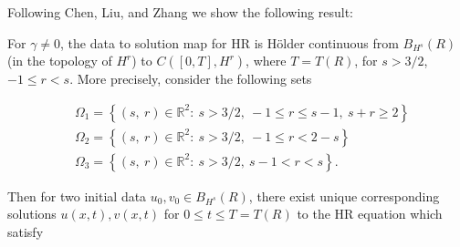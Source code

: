 \documentclass[handout]{beamer}
\numberwithin{equation}{section}
\newcommand{\rr}{\mathbb{R}}
\begin{document}
\begin{frame}
Following Chen, Liu, and Zhang \cite{Chen:2011fk} we show the
following result:


\begin{theorem}

\label{thm:main-thm}
For $\gamma \neq 0$, the
data to solution map for HR is H\"older continuous from $B_{H^{s}}(R)$ (in
the topology of $H^{r}$) to $C([0, T], H^{r})$, where $T = T(R)$, for $s >
3/2$, $-1 \le r < s$. More
precisely, consider the following sets 

  
  \begin{equation*}
  \begin{split}
      & \Omega_{1} = \left\{ (s, \ r) \in \rr^{2}:
     \ s>3/2, \ -1 \le r \le s-1, \ s + r \ge 2  \right\}
    \\
    & \Omega_{2} = \left\{ (s, \ r) \in \rr^{2}:
     \ s>3/2, \ -1 \le r < 2-s \right\}
    \\
    & \Omega_{3} = \left\{ (s, \ r) \in \rr^{2}:
    \  s>3/2, \  s-1 < r < s  \right\}.
    \end{split}
\end{equation*}
\end{theorem}
\end{frame}
\begin{frame}
\begin{theorem}
\begin{center}
\end{center}


Then for two initial data $u_{0}, v_{0} \in B_{H^{s}}(R)$, there exist unique
corresponding solutions $u(x,t), v(x,t)$ for $0 \le t \le T= T(R)$ to the
HR equation which satisfy 
\end{theorem}
\end{frame}
\end{document}
